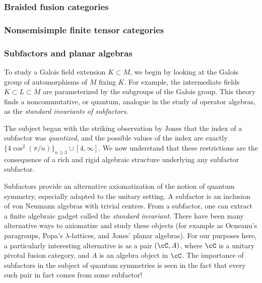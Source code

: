 \documentclass[11pt]{article}
\begin{document}


\subsubsection{Braided fusion categories}


\subsubsection{Nonsemisimple finite tensor categories}

\subsubsection{Subfactors and planar algebras}
To study a Galois field extension $K \subset M$, we begin by looking at the
Galois group of automorphisms of $M$ fixing $K$. For example, the intermediate
fields $K \subset L \subset M$ are parameterized by the subgroups of the
Galois group. This theory finds a noncommutative, or quantum, analogue in the
study of operator algebras, as the \emph{standard invariants of subfactors}.

The subject began with the striking observation by Jones that the index of a
subfactor was \emph{quantized}, and the possible values of the index are
exactly $\{4 \cos^2(\pi/n)\}_{n \geq 3} \cup [4,\infty]$. We now understand
that these restrictions are the consequence of a rich and rigid algebraic
structure underlying any subfactor subfactor.

Subfactors provide an alternative axiomatization of the notion of quantum
symmetry, especially adapted to the unitary setting. A subfactor is an
inclusion of von Neumann algebras with trivial centres. From a subfactor, one
can extract a finite algebraic gadget called the \emph{standard invariant}.
There have been many alternative ways to axiomatize and study these objects
(for example as Ocneanu's paragroups, Popa's $\lambda$-lattices, and Jones'
planar algebras). For our purposes here, a particularly interesting
alternative is as a pair $(\cC, A)$, where $\cC$ is a unitary pivotal fusion
category, and $A$ is an algebra object in $\cC$. The importance of subfactors
in the subject of quantum symmetries is seen in the fact that every such pair
in fact comes from some subfactor!
\end{document}
